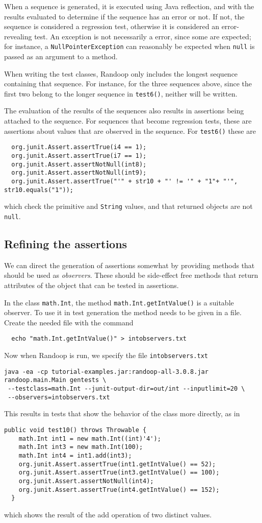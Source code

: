 \documentclass[11pt, oneside]{article} %
\newcommand{\code}[1]{{\texttt{#1}}}
\begin{document}
When a sequence is generated, it is executed using Java reflection, and with the results evaluated to determine if the sequence has an error or not. 
If not, the sequence is considered a regression test, otherwise it is considered an error-revealing test.
An exception is not necessarily a error, since some are expected; for instance, a \code{NullPointerException} can reasonably be expected when \code{null} is passed as an argument to a method. 

When writing the test classes, Randoop only includes the longest sequence containing that sequence.
For instance, for the three sequences above, since the first two belong to the longer sequence in \code{test6()}, neither will be written.

The evaluation of the results of the sequences also results in assertions being attached to the sequence. 
For sequences that become regression tests, these are assertions about values that are observed in the sequence.
For \code{test6()} these are
\begin{verbatim}
  org.junit.Assert.assertTrue(i4 == 1);
  org.junit.Assert.assertTrue(i7 == 1);
  org.junit.Assert.assertNotNull(int8);
  org.junit.Assert.assertNotNull(int9);
  org.junit.Assert.assertTrue("'" + str10 + "' != '" + "1"+ "'", str10.equals("1"));
\end{verbatim}
which check the primitive and \code{String} values, and that returned objects are not \code{null}.


\subsection{Refining the assertions}
We can direct the generation of assertions somewhat by providing methods that should be used as \emph{observers}.
These should be side-effect free methods that return attributes of the object that can be tested in assertions.

In the class \code{math.Int}, the method \code{math.Int.getIntValue()} is a suitable observer.
To use it in test generation the method needs to be given in a file.
Create the needed file with the command
\begin{verbatim}
  echo "math.Int.getIntValue()" > intobservers.txt
\end{verbatim}
Now when Randoop is run, we specify the file \texttt{intobservers.txt}
\begin{verbatim}
java -ea -cp tutorial-examples.jar:randoop-all-3.0.8.jar randoop.main.Main gentests \
 --testclass=math.Int --junit-output-dir=out/int --inputlimit=20 \
 --observers=intobservers.txt
\end{verbatim}
This results in tests that show the behavior of the class more directly, as in
\begin{verbatim}
public void test10() throws Throwable {
    math.Int int1 = new math.Int((int)'4');
    math.Int int3 = new math.Int(100);
    math.Int int4 = int1.add(int3);
    org.junit.Assert.assertTrue(int1.getIntValue() == 52);
    org.junit.Assert.assertTrue(int3.getIntValue() == 100);
    org.junit.Assert.assertNotNull(int4);
    org.junit.Assert.assertTrue(int4.getIntValue() == 152);
  }
\end{verbatim}
which shows the result of the add operation of two distinct values.
\end{document}
